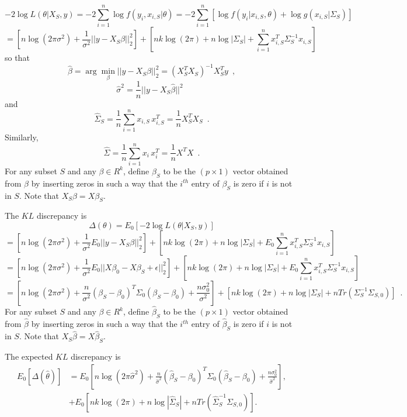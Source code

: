 \documentclass[11pt]{article}
\begin{document}
{\[
-2 \log L(\theta|X_S,y) = -2 \sum_{i=1}^n \log f(y_i,x_{i,S}|\theta) = -2 \sum_{i=1}^n [\log f(y_i|x_{i,S},\theta) + \log g(x_{i,S}|\Sigma_S)]
\]
\[
= \left [ n \log (2\pi \sigma^2) + \frac{1}{\sigma^2} || y-X_S\beta||_2^2 \right ] + \left [nk \log(2\pi) + n \log |\Sigma_S| + \sum_{i=1}^n x_{i,S}^T \Sigma_S^{-1} x_{i,S} \right ]
\]
so that
\[
\hat \beta = \arg \min_\beta ||y-X_S\beta||_2^2 = (X_S^TX_S)^{-1}X_S^T y \,\,\, ,
\]
\[
\hat \sigma^2 = \frac{1}{n} ||y-X_S \hat \beta||^2 \,\,\,
\]
and
\[
\hat \Sigma_S = \frac{1}{n} \sum_{i=1}^n x_{i,S} \, x_{i,S}^T = \frac{1}{n} X_S^T X_S \,\,\, .
\]
Similarly,
\[
\hat \Sigma = \frac{1}{n} \sum_{i=1}^n x_i \, x_i^T = \frac{1}{n} X^T X \,\,\, .
\]
For any subset $S$ and any $\beta \in R^k$, define $\beta_S$ to be the $(p \times 1)$ vector obtained from $\beta$ by inserting zeros in such a way that the $i^{th}$ entry of
$\beta_S$ is zero if $i$ is not in $S$. Note that $X_S \beta = X \beta_S$.

The $KL$ discrepancy is
\[
\Delta (\theta) = E_0 [-2 \log L(\theta | X_S,y)]
\]
\[
= \left [ n \log (2\pi \sigma^2) + \frac{1}{\sigma^2} E_0 || y-X_S\beta||_2^2 \right ] + \left [nk \log(2\pi) + n \log |\Sigma_S| + E_0 \sum_{i=1}^n x_{i,S}^T \Sigma_S^{-1} x_{i,S} \right ]
\]
\[
= \left [ n \log (2\pi \sigma^2) + \frac{1}{\sigma^2} E_0 || X\beta_0-X \beta_S+\epsilon||_2^2 \right ] + \left [nk \log(2\pi) + n \log |\Sigma_S| + E_0 \sum_{i=1}^n x_{i,S}^T \Sigma_S^{-1} x_{i,S} \right ]
\]
\[
= \left [ n \log (2\pi \sigma^2) + \frac{n}{\sigma^2}  (\beta_S-\beta_0)^T \Sigma_0 (\beta_S-\beta_0) + \frac{n\sigma_0^2}{\sigma^2} \right ] + \left [nk \log(2\pi) + n \log |\Sigma_S| + n Tr(\Sigma_S^{-1}\Sigma_{S,0}) \right ] \,\,\, .
\]
For any subset $S$ and any $\beta \in R^k$, define $\hat \beta_S$ to be the $(p \times 1)$ vector obtained from $\hat \beta$ by inserting zeros in such a way that the $i^{th}$ entry of
$\hat \beta_S$ is zero if $i$ is not in $S$. Note that $X_S \hat \beta = X \hat \beta_S$.

The expected $KL$ discrepancy is
\begin{equation}
\begin{aligned}
E_0 [\Delta (\hat \theta)] &=  E_0 \left [ n\log (2\pi \hat \sigma^2) + \frac{n}{\hat \sigma^2}  (\hat \beta_S-\beta_0)^T \Sigma_0 (\hat \beta_S-\beta_0) + \frac{n\sigma_0^2}{\hat \sigma^2} \right ], \\
&+E_0 \left [nk \log(2\pi) + n\log |\hat \Sigma_S| + n Tr(\hat \Sigma_S^{-1}\Sigma_{S,0}) \right ].
\end{aligned}
\label{eq:ekl}
\end{equation}

}
\end{document}
